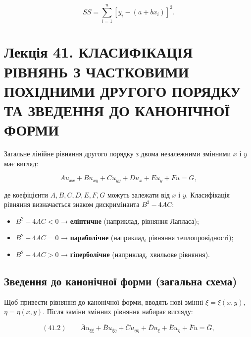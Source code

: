 \documentclass[
  ukrainian,
]{article}
\providecommand{\tightlist}{%
  \setlength{\itemsep}{0pt}\setlength{\parskip}{0pt}}
\begin{document}
\[SS = \sum_{i=1}^{n} [y_i - (a + bx_i)]^2.\]

\section{Лекція 41. КЛАСИФІКАЦІЯ РІВНЯНЬ З ЧАСТКОВИМИ ПОХІДНИМИ ДРУГОГО
ПОРЯДКУ ТА ЗВЕДЕННЯ ДО КАНОНІЧНОЇ
ФОРМИ}\label{ux43bux435ux43aux446ux456ux44f-41.-ux43aux43bux430ux441ux438ux444ux456ux43aux430ux446ux456ux44f-ux440ux456ux432ux43dux44fux43dux44c-ux437-ux447ux430ux441ux442ux43aux43eux432ux438ux43cux438-ux43fux43eux445ux456ux434ux43dux438ux43cux438-ux434ux440ux443ux433ux43eux433ux43e-ux43fux43eux440ux44fux434ux43aux443-ux442ux430-ux437ux432ux435ux434ux435ux43dux43dux44f-ux434ux43e-ux43aux430ux43dux43eux43dux456ux447ux43dux43eux457-ux444ux43eux440ux43cux438}

Загальне лінійне рівняння другого порядку з двома незалежними змінними
\(x\) і \(y\) має вигляд:

\[A u_{xx} + B u_{xy} + C u_{yy} + D u_x + E u_y + F u = G,\]

де коефіцієнти \(A, B, C, D, E, F, G\) можуть залежати від \(x\) і
\(y\). Класифікація рівняння визначається знаком дискримінанта
\(B^2 - 4AC\):

\begin{itemize}
\tightlist
\item
  \(B^2 - 4AC < 0\) → \textbf{еліптичне} (наприклад, рівняння Лапласа);
\item
  \(B^2 - 4AC = 0\) → \textbf{параболічне} (наприклад, рівняння
  теплопровідності);
\item
  \(B^2 - 4AC > 0\) → \textbf{гіперболічне} (наприклад, хвильове
  рівняння).
\end{itemize}

\subsection{Зведення до канонічної форми (загальна
схема)}\label{ux437ux432ux435ux434ux435ux43dux43dux44f-ux434ux43e-ux43aux430ux43dux43eux43dux456ux447ux43dux43eux457-ux444ux43eux440ux43cux438-ux437ux430ux433ux430ux43bux44cux43dux430-ux441ux445ux435ux43cux430}

Щоб привести рівняння до канонічної форми, вводять нові змінні
\(\xi = \xi(x, y)\), \(\eta = \eta(x, y)\). Після заміни змінних
рівняння набирає вигляду:

\[(41.2)\qquad\overline{A} u_{\xi\xi} + \overline{B} u_{\xi\eta} + \overline{C} u_{\eta\eta} + \overline{D} u_{\xi} + \overline{E} u_{\eta} + \overline{F} u = \overline{G},\]
\end{document}
